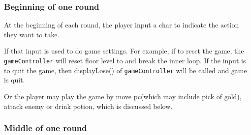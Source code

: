 \documentclass[11pt]{article}
\theoremstyle{plain} \newtheorem{theorem*}{Theorem}[subsection]
\begin{document}
\subsubsection{ Beginning of one round }

At the beginning of each round, the player input a char to indicate the 
action they want to take. 

If that input is used to do game settings. For example, if to reset the game,
the \texttt{gameController} will reset floor level to and break the inner
loop. If the input is to quit the game, then \textsf{displayLose()} of
\texttt{gameController} will be called and game is quit.

Or the player may play the game by move pc(which may include pick of gold),
attack enemy or drink potion, which is discussed below.


\subsubsection{Middle of one round}
\end{document}
